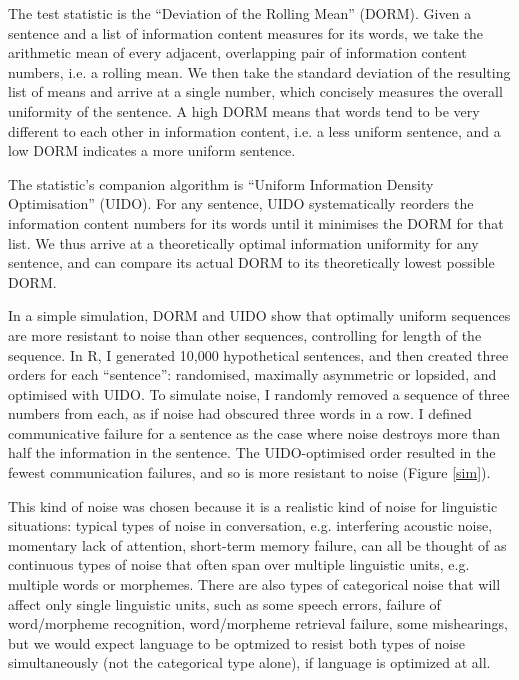 \documentclass[12pt]{article}
\begin{document}
The test statistic is the ``Deviation of the Rolling Mean'' (DORM). Given a sentence and a list of information content measures for its words, we take the arithmetic mean of every adjacent, overlapping pair of information content numbers, i.e. a rolling mean. We then take the standard deviation of the resulting list of means and arrive at a single number, which concisely measures the overall uniformity of the sentence. A high DORM means that words tend to be very different to each other in information content, i.e. a less uniform sentence, and a low DORM indicates a more uniform sentence.

The statistic's companion algorithm is ``Uniform Information Density Optimisation'' (UIDO). For any sentence, UIDO systematically reorders the information content numbers for its words until it minimises the DORM for that list. We thus arrive at a theoretically optimal information uniformity for any sentence, and can compare its actual DORM to its theoretically lowest possible DORM.

In a simple simulation, DORM and UIDO show that optimally uniform sequences are more resistant to noise than other sequences, controlling for length of the sequence. In R, I generated 10,000 hypothetical sentences, and then created three orders for each ``sentence'': randomised, maximally asymmetric or lopsided, and optimised with UIDO. To simulate noise, I randomly removed a sequence of three numbers from each, as if noise had obscured three words in a row. I defined communicative failure for a sentence as the case where noise destroys more than half the information in the sentence. The UIDO-optimised order resulted in the fewest communication failures, and so is more resistant to noise (Figure \ref{sim}).

This kind of noise was chosen because it is a realistic kind of noise for linguistic situations: typical types of noise in conversation, e.g. interfering acoustic noise, momentary lack of attention, short-term memory failure, can all be thought of as continuous types of noise that often span over multiple linguistic units, e.g. multiple words or morphemes. There are also types of categorical noise that will affect only single linguistic units, such as some speech errors, failure of word/morpheme recognition, word/morpheme retrieval failure, some mishearings, but we would expect language to be optmized to resist both types of noise simultaneously (not the categorical type alone), if language is optimized at all.
\end{document}
